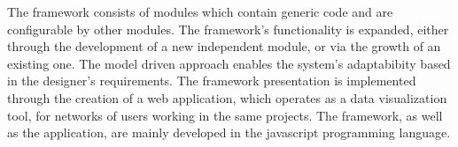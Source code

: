 	The framework consists of modules which contain generic code and are configurable by other modules. The framework's functionality is expanded, either through the development of a new independent module, or via the growth of an existing one. The model driven approach enables the system's adaptabibity based in the designer's requirements. The framework presentation is implemented through the creation of a web application, which operates as a data visualization tool, for networks of users working in the same projects. The framework, as well as the application, are mainly developed in the javascript programming language.


%
